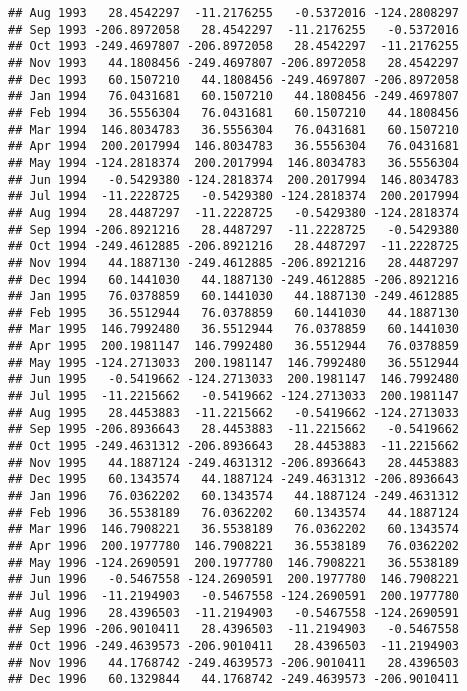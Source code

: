 \documentclass[]{article}
\begin{document}
\begin{verbatim}
## Aug 1993   28.4542297  -11.2176255   -0.5372016 -124.2808297
## Sep 1993 -206.8972058   28.4542297  -11.2176255   -0.5372016
## Oct 1993 -249.4697807 -206.8972058   28.4542297  -11.2176255
## Nov 1993   44.1808456 -249.4697807 -206.8972058   28.4542297
## Dec 1993   60.1507210   44.1808456 -249.4697807 -206.8972058
## Jan 1994   76.0431681   60.1507210   44.1808456 -249.4697807
## Feb 1994   36.5556304   76.0431681   60.1507210   44.1808456
## Mar 1994  146.8034783   36.5556304   76.0431681   60.1507210
## Apr 1994  200.2017994  146.8034783   36.5556304   76.0431681
## May 1994 -124.2818374  200.2017994  146.8034783   36.5556304
## Jun 1994   -0.5429380 -124.2818374  200.2017994  146.8034783
## Jul 1994  -11.2228725   -0.5429380 -124.2818374  200.2017994
## Aug 1994   28.4487297  -11.2228725   -0.5429380 -124.2818374
## Sep 1994 -206.8921216   28.4487297  -11.2228725   -0.5429380
## Oct 1994 -249.4612885 -206.8921216   28.4487297  -11.2228725
## Nov 1994   44.1887130 -249.4612885 -206.8921216   28.4487297
## Dec 1994   60.1441030   44.1887130 -249.4612885 -206.8921216
## Jan 1995   76.0378859   60.1441030   44.1887130 -249.4612885
## Feb 1995   36.5512944   76.0378859   60.1441030   44.1887130
## Mar 1995  146.7992480   36.5512944   76.0378859   60.1441030
## Apr 1995  200.1981147  146.7992480   36.5512944   76.0378859
## May 1995 -124.2713033  200.1981147  146.7992480   36.5512944
## Jun 1995   -0.5419662 -124.2713033  200.1981147  146.7992480
## Jul 1995  -11.2215662   -0.5419662 -124.2713033  200.1981147
## Aug 1995   28.4453883  -11.2215662   -0.5419662 -124.2713033
## Sep 1995 -206.8936643   28.4453883  -11.2215662   -0.5419662
## Oct 1995 -249.4631312 -206.8936643   28.4453883  -11.2215662
## Nov 1995   44.1887124 -249.4631312 -206.8936643   28.4453883
## Dec 1995   60.1343574   44.1887124 -249.4631312 -206.8936643
## Jan 1996   76.0362202   60.1343574   44.1887124 -249.4631312
## Feb 1996   36.5538189   76.0362202   60.1343574   44.1887124
## Mar 1996  146.7908221   36.5538189   76.0362202   60.1343574
## Apr 1996  200.1977780  146.7908221   36.5538189   76.0362202
## May 1996 -124.2690591  200.1977780  146.7908221   36.5538189
## Jun 1996   -0.5467558 -124.2690591  200.1977780  146.7908221
## Jul 1996  -11.2194903   -0.5467558 -124.2690591  200.1977780
## Aug 1996   28.4396503  -11.2194903   -0.5467558 -124.2690591
## Sep 1996 -206.9010411   28.4396503  -11.2194903   -0.5467558
## Oct 1996 -249.4639573 -206.9010411   28.4396503  -11.2194903
## Nov 1996   44.1768742 -249.4639573 -206.9010411   28.4396503
## Dec 1996   60.1329844   44.1768742 -249.4639573 -206.9010411

\end{verbatim}
\end{document}
